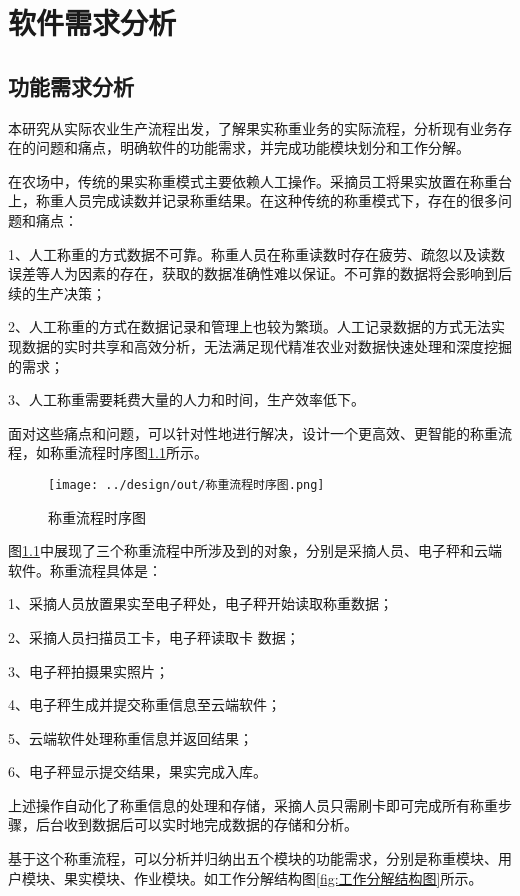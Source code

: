 \chapter{软件需求分析}

\section{功能需求分析}

本研究从实际农业生产流程出发，了解果实称重业务的实际流程，分析现有业务存在的问题和痛点，明确软件的功能需求，并完成功能模块划分和工作分解。

在农场中，传统的果实称重模式主要依赖人工操作。采摘员工将果实放置在称重台上，称重人员完成读数并记录称重结果。在这种传统的称重模式下，存在的很多问题和痛点：

1、人工称重的方式数据不可靠。称重人员在称重读数时存在疲劳、疏忽以及读数误差等人为因素的存在，获取的数据准确性难以保证。不可靠的数据将会影响到后续的生产决策；

2、人工称重的方式在数据记录和管理上也较为繁琐。人工记录数据的方式无法实现数据的实时共享和高效分析，无法满足现代精准农业对数据快速处理和深度挖掘的需求；

3、人工称重需要耗费大量的人力和时间，生产效率低下。

面对这些痛点和问题，可以针对性地进行解决，设计一个更高效、更智能的称重流程，如称重流程时序图\ref{fig:称重流程时序图}所示。

\begin{figure}[H]
    \centering
    \texttt{[image: ../design/out/称重流程时序图.png]}
    \caption{称重流程时序图}
    \label{fig:称重流程时序图}
\end{figure}

图\ref{fig:称重流程时序图}中展现了三个称重流程中所涉及到的对象，分别是采摘人员、电子秤和云端软件。称重流程具体是：

1、采摘人员放置果实至电子秤处，电子秤开始读取称重数据；

2、采摘人员扫描员工卡，电子秤读取卡
数据；

3、电子秤拍摄果实照片；

4、电子秤生成并提交称重信息至云端软件；

5、云端软件处理称重信息并返回结果；

6、电子秤显示提交结果，果实完成入库。

上述操作自动化了称重信息的处理和存储，采摘人员只需刷卡即可完成所有称重步骤，后台收到数据后可以实时地完成数据的存储和分析。

基于这个称重流程，可以分析并归纳出五个模块的功能需求，分别是称重模块、用户模块、果实模块、作业模块。如工作分解结构图\ref{fig:工作分解结构图}所示。

